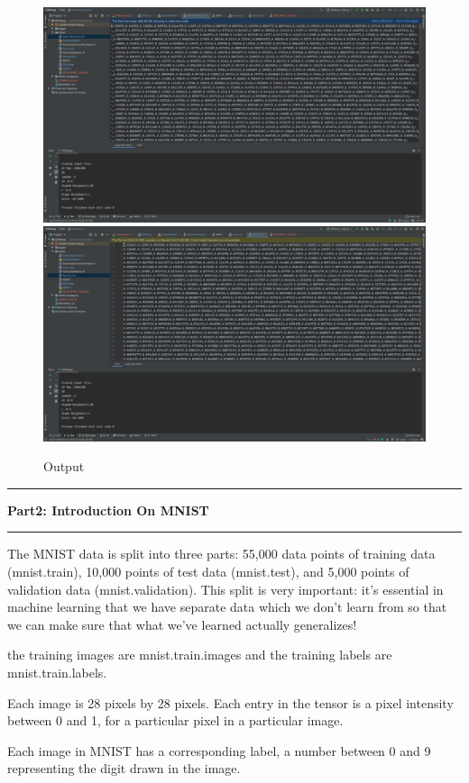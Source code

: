 \documentclass[11pt]{article}
\newcommand\question[2]{\vspace{.25in}\hrule\textbf{#1: #2}\vspace{.5em}\hrule\vspace{.10in}}
\begin{document}
\begin{figure}[H]
    \centering
    \includegraphics[width=1\textwidth]{Fig5}
    \includegraphics[width=1\textwidth]{Fig4}
    \caption{Output}
\end{figure}


\newpage \question{Part2}{Introduction On MNIST}
The MNIST data is split into three parts: 55,000 data points of training data (mnist.train), 10,000 points of test data (mnist.test), and 5,000 points of validation data (mnist.validation). This split is very important: it's essential in machine learning that we have separate data which we don't learn from so that we can make sure that what we've learned actually generalizes!

the training images are mnist.train.images and the training labels are mnist.train.labels.

Each image is 28 pixels by 28 pixels. Each entry in the tensor is a pixel intensity between 0 and 1, for a particular pixel in a particular image.

Each image in MNIST has a corresponding label, a number between 0 and 9 representing the digit drawn in the image.
\end{document}

